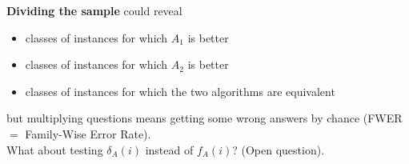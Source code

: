 \textbf{Dividing the sample} could reveal
\begin{itemize}
	\item classes of instances for which $A_1$ is better
	\item classes of instances for which $A_2$ is better
	\item classes of instances for which the two algorithms are equivalent
\end{itemize}
but multiplying questions means getting some wrong answers by chance (FWER $=$ Family-Wise Error Rate). \\

What about testing $\delta_A (i)$ instead of $f_A (i )$? (Open question).\\


\newpage